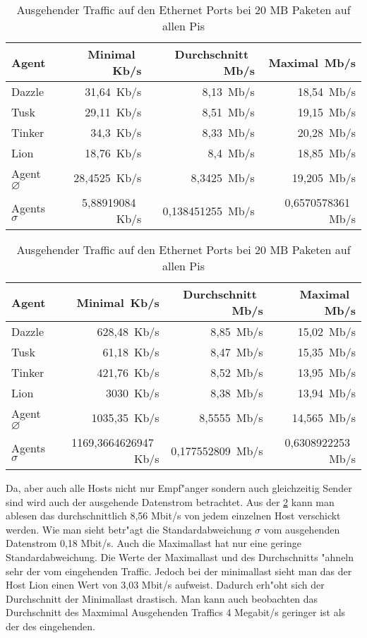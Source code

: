 \begin{table}
\centering
\begin{tabular}{l%
 r<{\,Kb/s}%
 r<{\,Mb/s}%
 r<{\,Mb/s}%
}
Agent  				& Minimal		& Durchschnitt		& Maximal	\\
\hline
Dazzle 				& 31,64			& 8,13 			& 18,54		\\
Tusk 				& 29,11			& 8,51			& 19,15		\\
Tinker				& 34,3			& 8,33			& 20,28		\\
Lion				& 18,76			& 8,4			& 18,85		\\ 
Agent $\diameter $	 	& 28,4525		& 8,3425		& 19,205	\\   
Agents $\sigma $		& 5,88919084		& 0,138451255		& 0,6570578361	\\

\end{tabular}
\caption{Eingehender Traffic auf den Ethernet Ports bei 20 MB Paketen auf allen Pis}
\label{tab:EingehenderTraffic20Mb}
\begin{tabular}{l%
 r<{\,Kb/s}%
 r<{\,Mb/s}%
 r<{\,Mb/s}%
}
Agent  				& Minimal		& Durchschnitt		& Maximal	\\	
\hline
Dazzle 				& 628,48		& 8,85	 		& 15,02		\\
Tusk 				& 61,18			& 8,47			& 15,35		\\
Tinker				& 421,76		& 8,52			& 13,95		\\
Lion				& 3030			& 8,38			& 13,94		\\ 
Agent $\diameter $	 	& 1035,35		& 8,5555		& 14,565	\\   
Agents $\sigma $		& 1169,3664626947	& 0,177552809		& 0,6308922253	\\

\end{tabular}
\caption{Ausgehender Traffic auf den Ethernet Ports bei 20 MB Paketen auf allen Pis}
\label{tab:AusgehenderTraffic20Mb}

\end{table}

Da, aber auch alle Hosts nicht nur Empf"anger sondern auch gleichzeitig Sender sind wird auch der ausgehende %
Datenstrom betrachtet. Aus der \cref{tab:AusgehenderTraffic20Mb} kann man ablesen das durchschnittlich %
8,56 Mbit/s von jedem einzelnen Host verschickt werden. Wie man sieht betr"agt die Standardabweichung %
$\sigma$ vom ausgehenden Datenstrom 0,18 Mbit/s. Auch die Maximallast hat nur eine geringe Standardabweichung. %
Die Werte der Maximallast und des Durchschnitts "ahneln sehr der vom eingehenden Traffic. %
Jedoch bei der minimallast sieht man das der Host Lion einen Wert von 3,03 Mbit/s aufweist. %
Dadurch erh"oht sich der Durchschnitt der Minimallast drastisch. Man kann auch beobachten %
das Durchschnitt des Maxmimal Ausgehenden Traffics 4 Megabit/s geringer ist als der des eingehenden. %


